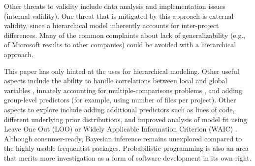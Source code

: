 \documentclass[sigconf,natbib=false]{acmart}
\begin{document}
Other threats to validity include data analysis and implementation issues
(internal validity). One threat that is mitigated by this approach is external
validity, since a hierarchical model inherently accounts for inter-project
differences. Many of the common complaints about lack of generalizability (e.g.,
of Microsoft results to other companies) could be avoided with a hierarchical
approach.

This paper has only hinted at the uses for hierarchical modeling. Other useful
aspects include the ability to handle correlations between local and global
variables \cite{mcilreath16}, innately accounting for multiple-comparisons
problems \cite{Gelman:2012aa}, and adding group-level predictors (for example,
using number of files per project). Other aspects to explore include adding
additional predictors such as lines of code, different underlying prior
distributions, and improved analysis of model fit using Leave One Out (LOO) or
Widely Applicable Information Criterion (WAIC) \cite{vehtari15}. Although
consumer-ready, Bayesian inference remains unexplored compared to the highly
usable frequentist packages. Probabilistic programming is also an area that
merits more investigation as a form of software development in its own right.
\end{document}
